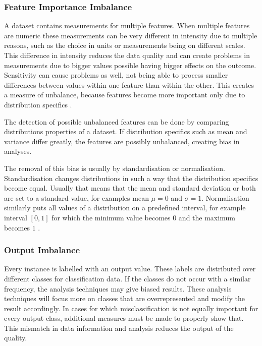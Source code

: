 \documentclass[10pt,a4paper]{report}
\begin{document}
	\subsubsection{Feature Importance Imbalance}
	\label{DEsubsec:Normalisation}
	
	A dataset contains measurements for multiple features. When multiple features are numeric these measurements can be very different in intensity due to multiple reasons, such as the choice in units or measurements being on different scales. This difference in intensity reduces the data quality and can create problems in measurements due to bigger values possible having bigger effects on the outcome. Sensitivity can cause problems as well, not being able to process smaller differences between values within one feature than within the other. This creates a measure of unbalance, because features become more important only due to distribution specifics \cite{al2006normalization, patro2015normalization}. 
	
	The detection of possible unbalanced features can be done by comparing distributions properties of a dataset. If distribution specifics such as mean and variance differ greatly, the features are possibly unbalanced, creating bias in analyses. 
	
	The removal of this bias is usually by standardisation or normalisation. Standardisation changes distributions in such a way that the distribution specifics become equal. Usually that means that the mean and standard deviation or both are set to a standard value, for examples mean $\mu = 0$ and $\sigma = 1$. Normalisation similarly puts all values of a distribution on a predefined interval, for example interval $[0, 1]$ for which the minimum value becomes $0$ and the maximum becomes $1$ \cite{al2006normalization, patro2015normalization}. 
	
	\subsubsection{Output Imbalance}
	\label{DEsubsec:OutputImbalance}
	
	Every instance is labelled with an output value. These labels are distributed over different classes for classification data. If the classes do not occur with a similar frequency, the analysis techniques may give biased results. These analysis techniques will focus more on classes that are overrepresented and modify the result accordingly. In cases for which misclassification is not equally important for every output class, additional measures must be made to properly show that. This mismatch in data information and analysis reduces the output of the quality.
	
\end{document}
